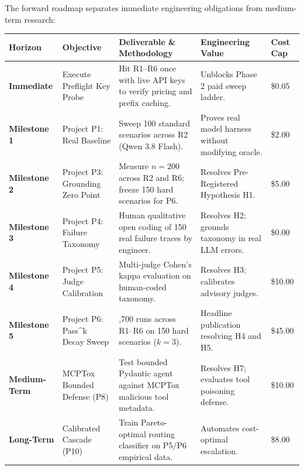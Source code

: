 The forward roadmap separates immediate engineering obligations from medium-term research:

\begin{center}
\begingroup
\scriptsize
\renewcommand{\arraystretch}{0.85}
\setlength{\tabcolsep}{2.5pt}
\begin{tabularx}{\textwidth}{l>{\raggedright\arraybackslash}p{}>{\raggedright\arraybackslash}p{}>{\raggedright\arraybackslash}Xl}
\toprule
\textbf{Horizon} & \textbf{Objective} & \textbf{Deliverable \& Methodology} & \textbf{Engineering Value} & \textbf{Cost Cap} \\
\midrule
\textbf{Immediate} & Execute Preflight Key Probe & Hit R1--R6 once with live API keys to verify pricing and prefix caching. & Unblocks Phase 2 paid sweep ladder. & \$0.05 \\
\textbf{Milestone 1} & Project P1: Real Baseline & Sweep 100 standard scenarios across R2 (Qwen 3.8 Flash). & Proves real model harness without modifying oracle. & \$2.00 \\
\textbf{Milestone 2} & Project P3: Grounding Zero Point & Measure $n=200$ across R2 and R6; freeze 150 hard scenarios for P6. & Resolves Pre-Registered Hypothesis H1. & \$5.00 \\
\textbf{Milestone 3} & Project P4: Failure Taxonomy & Human qualitative open coding of 150 real failure traces by engineer. & Resolves H2; grounds taxonomy in real LLM errors. & \$0.00 \\
\textbf{Milestone 4} & Project P5: Judge Calibration & Multi-judge Cohen's kappa evaluation on human-coded taxonomy. & Resolves H3; calibrates advisory judges. & \$10.00 \\
\textbf{Milestone 5} & Project P6: Pass\^{}k Decay Sweep & 2,700 runs across R1--R6 on 150 hard scenarios ($k=3$). & Headline publication resolving H4 and H5. & \$45.00 \\
\textbf{Medium-Term} & MCPTox Bounded Defense (P8) & Test bounded Pydantic agent against MCPTox malicious tool metadata. & Resolves H7; evaluates tool poisoning defense. & \$10.00 \\
\textbf{Long-Term} & Calibrated Cascade (P10) & Train Pareto-optimal routing classifier on P5/P6 empirical data. & Automates cost-optimal escalation. & \$8.00 \\
\bottomrule
\end{tabularx}
\endgroup
\end{center}

\vspace{8pt}
